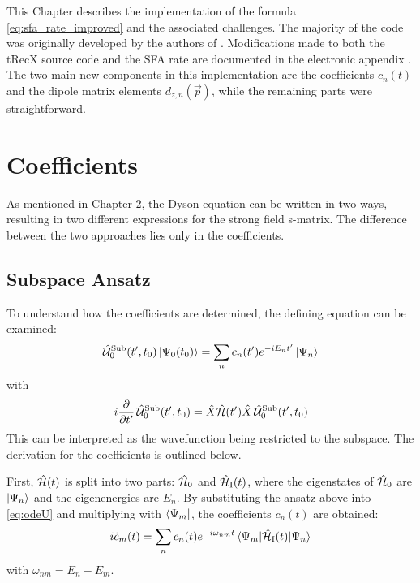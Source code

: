 This Chapter describes the implementation of the formula \eqref{eq:sfa_rate_improved} and the associated challenges.
The majority of the code was originally developed by the authors of \cite{Theory_NPS}.
Modifications made to both the tRecX source code and the SFA rate are documented in the electronic appendix \cite{johannes_porsch_2025_16223179}.
The two main new components in this implementation are the coefficients $c_n(t)$ and the dipole matrix elements $d_{z,n}(\vec{p})$, while the remaining parts were straightforward.

\section{Coefficients}
As mentioned in Chapter 2, the Dyson equation can be written in two ways, resulting in two different expressions for the strong field s-matrix.
The difference between the two approaches lies only in the coefficients.



\subsection{Subspace Ansatz}
To understand how the coefficients are determined, the defining equation can be examined:
\begin{equation*}
    \hat{\mathcal{U}}^{\mathrm{Sub}}_0(t',t_0)\ket{\Psi_0(t_0)} = \sum_{n}c_n(t')e^{-iE_nt'}\ket{\Psi_n}
\end{equation*}
with
\begin{equation}
    i\frac{\partial}{\partial t'} \, \hat{\mathcal{U}}^{\mathrm{Sub}}_0(t',t_0) = \hat{X}\hat{\mathcal{H}}(t')\hat{X}\,\hat{\mathcal{U}}^{\mathrm{Sub}}_0(t',t_0)    \label{eq:odeU}
\end{equation}
This can be interpreted as the wavefunction being restricted to the subspace.
The derivation for the coefficients is outlined below.

First, $\hat{\mathcal{H}}(t)$ is split into two parts: $\hat{\mathcal{H}}_0$ and $\hat{\mathcal{H}}_{\mathrm{I}}(t)$, where the eigenstates of $\hat{\mathcal{H}}_0$ are ${\ket{\Psi_n}}$ and the eigenenergies are ${E_n}$. 
By substituting the ansatz above into \eqref{eq:odeU} and multiplying with $\bra{\Psi_m}$, the coefficients $c_n(t)$ are obtained:
\begin{equation*}
    i  \dot{c}_m(t) = \sum_n c_n(t) e^{-i \omega_{nm} t} \braket{\Psi_m|\hat{\mathcal{H}}_{\mathrm{I}}(t)|\Psi_n}  \label{eq:ode}
\end{equation*}
with $\omega_{nm} = E_n - E_m$.

